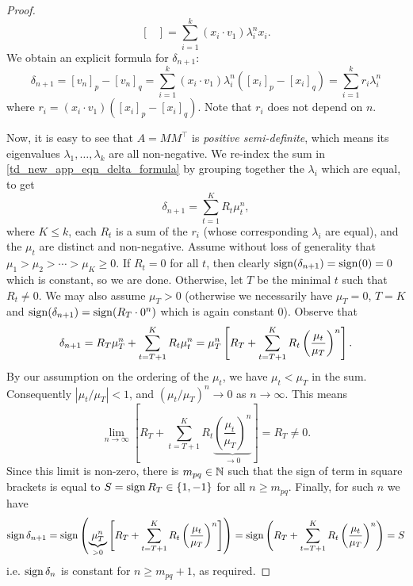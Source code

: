 \begin{proof}
\[\begin{bmatrix}
        \end{bmatrix}
        = \sum_{i=1}^{k}{(x_i \cdot v_1) \lambda_i^n x_i}.
    \]
    We obtain an explicit formula for $\delta_{n+1}$:
    \begin{equation}
        \label{td_new_app_eqn_delta_formula}
        \delta_{n+1}
        = [v_n]_p - [v_n]_q
        = \sum_{i=1}^{k}{
            (x_i \cdot v_1) \lambda_i^n \left( [x_i]_p - [x_i]_q \right)
        }
        = \sum_{i=1}^{k}{r_i \lambda_i^n}
    \end{equation}
    where $r_i = (x_i \cdot v_1)\left( [x_i]_p - [x_i]_q \right)$. Note that
    $r_i$ does not depend on $n$.

    Now, it is easy to see that $A = MM^\top$ is \emph{positive semi-definite},
    which means its eigenvalues $\lambda_1,\ldots,\lambda_k$ are all
    non-negative. We re-index the sum in \cref{td_new_app_eqn_delta_formula} by
    grouping together the $\lambda_i$ which are equal, to get
    \[
        \delta_{n+1} = \sum_{t=1}^{K}{R_t \mu_t^n},
    \]
    where $K \le k$, each $R_t$ is a sum of the $r_i$ (whose corresponding
    $\lambda_i$ are equal), and the $\mu_t$ are distinct and non-negative.
    Assume without loss of generality that $\mu_1 > \mu_2 > \cdots > \mu_K \ge
    0$. If $R_t = 0$ for all $t$, then clearly $\operatorname{sign}(\delta_{n+1}) = \operatorname{sign}(0)
    = 0$ which is constant, so we are done. Otherwise, let $T$ be the minimal
    $t$ such that $R_t \ne 0$. We may also assume $\mu_T > 0$ (otherwise we
    necessarily have $\mu_T = 0$, $T=K$ and $\operatorname{sign}(\delta_{n+1}) = \operatorname{sign}(R_T
    \cdot 0^n)$ which is again constant 0). Observe that
    \[
        \delta_{n+1}
        = R_T \mu_T^n + \sum_{t=T + 1}^{K}{R_t \mu_t^n} \\
        = \mu_T^n \left[
            R_T + \sum_{t=T + 1}^{K}{
                R_t \left(\frac{\mu_t}{\mu_T}\right)^n
            }
        \right].
    \]
    By our assumption on the ordering of the $\mu_t$, we have $\mu_t < \mu_T$
    in the sum. Consequently $|\mu_t / \mu_T| < 1$, and $(\mu_t / \mu_T)^n \to
    0$ as $n \to \infty$. This means
    \[
        \lim_{n \to \infty}{\left[
            R_T + \sum_{t=T + 1}^{K}{
                R_t \underbrace{\left(\frac{\mu_t}{\mu_T}\right)^n}_{\to 0}
            }
        \right]}
        = R_T
        \ne 0.
    \]
    Since this limit is non-zero, there is $m_{pq} \in \mathbb{N}$ such that the sign
    of term in square brackets is
    equal to $S = \operatorname{sign} R_T \in \{1, -1\}$ for all $n \ge m_{pq}$. Finally,
    for such $n$ we have
    \[
        \operatorname{sign} \delta_{n+1}
        = \operatorname{sign} \left(
            \underbrace{\mu_T^n}_{> 0}
            \left[
                R_T + \sum_{t=T + 1}^{K}{
                    R_t \left(\frac{\mu_t}{\mu_T}\right)^n
                }
            \right]
        \right)
        = \operatorname{sign} \left(
            R_T + \sum_{t=T + 1}^{K}{
                R_t \left(\frac{\mu_t}{\mu_T}\right)^n
            }
        \right)
        = S
    \]
    i.e. $\operatorname{sign} \delta_n$ is constant for $n \ge m_{pq} + 1$, as required.


\end{proof}
